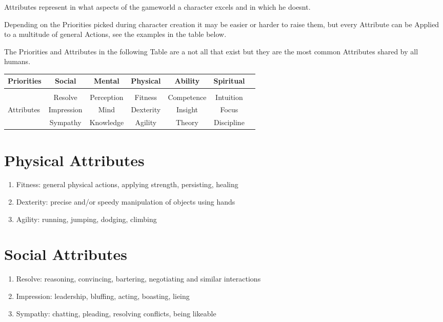 Attributes represent in what aspects of the gameworld a character excels and in which he doesnt.\par
Depending on the Priorities picked during character creation it may be easier or harder to raise them, but every
Attribute can be Applied to a multitude of general Actions, see the examples in the table below.\par
The Priorities and Attributes in the following Table are a not all that exist
but they are the most common Attributes shared by all humans.\par
\begin{tabular}{l||cccccc}
    Priorities      &Social        &Mental         &Physical    &Ability     &Spiritual  \\\hline\\
                    &Resolve       &Perception     &Fitness     &Competence  &Intuition \\
    Attributes      &Impression    &Mind           &Dexterity   &Insight     &Focus\\
                    &Sympathy      &Knowledge      &Agility     &Theory      &Discipline\\



\end{tabular}\vspace{1cm}
\section{Physical Attributes}\label{sec:physical-attributes}
\begin{enumerate}[label= -]
    \item {Fitness}: general physical actions, applying strength, persisting, healing
    \item {Dexterity}: precise and/or speedy manipulation of objects using hands
    \item {Agility}: running, jumping, dodging, climbing
\end{enumerate}
\section{Social Attributes}\label{sec:charisma-attributes}
\begin{enumerate}[label= -]
    \item {Resolve}: reasoning, convincing, bartering, negotiating and similar interactions
    \item {Impression}: leadership, bluffing, acting, boasting, lieing
    \item {Sympathy}: chatting, pleading, resolving conflicts, being likeable
\end{enumerate}
